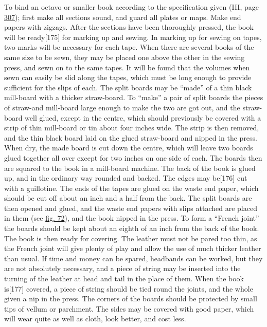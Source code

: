 \documentclass[
]{article}
\begin{document}
To bind an octavo or smaller book according to the specification given
(III, page \protect\hyperlink{Page_307}{307}); first make all sections
sound, and guard all plates or maps. Make end papers with zigzags. After
the sections have been thoroughly pressed, the book will be
ready{\protect\hypertarget{Page_175}{}{{[}175{]}}} for marking up and
sewing. In marking up for sewing on tapes, two marks will be necessary
for each tape. When there are several books of the same size to be sewn,
they may be placed one above the other in the sewing press, and sewn on
to the same tapes. It will be found that the volumes when sewn can
easily be slid along the tapes, which must be long enough to provide
sufficient for the slips of each. The split boards may be ``made'' of a
thin black mill-board with a thicker straw-board. To ``make'' a pair of
split boards the pieces of straw-and mill-board large enough to make the
two are got out, and the straw-board well glued, except in the centre,
which should previously be covered with a strip of thin mill-board or
tin about four inches wide. The strip is then removed, and the thin
black board laid on the glued straw-board and nipped in the press. When
dry, the made board is cut down the centre, which will leave two boards
glued together all over except for two inches on one side of each. The
boards then are squared to the book in a mill-board machine. The back of
the book is glued up, and in the ordinary way rounded and backed. The
edges may be{\protect\hypertarget{Page_176}{}{{[}176{]}}} cut with a
guillotine. The ends of the tapes are glued on the waste end paper,
which should be cut off about an inch and a half from the back. The
split boards are then opened and glued, and the waste end papers with
slips attached are placed in them (see \protect\hyperlink{Fig_72}{fig.
72}), and the book nipped in the press. To form a ``French joint'' the
boards should be kept about an eighth of an inch from the back of the
book. The book is then ready for covering. The leather must not be pared
too thin, as the French joint will give plenty of play and allow the use
of much thicker leather than usual. If time and money can be spared,
headbands can be worked, but they are not absolutely necessary, and a
piece of string may be inserted into the turning of the leather at head
and tail in the place of them. When the book
is{\protect\hypertarget{Page_177}{}{{[}177{]}}} covered, a piece of
string should be tied round the joints, and the whole given a nip in the
press. The corners of the boards should be protected by small tips of
vellum or parchment. The sides may be covered with good paper, which
will wear quite as well as cloth, look better, and cost less.
\end{document}
